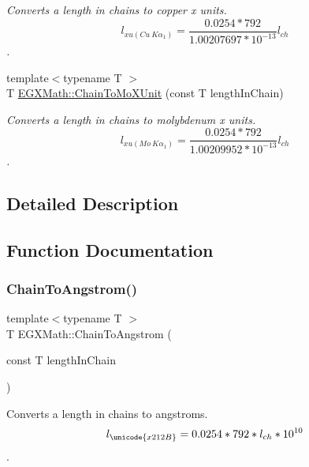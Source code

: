 \begin{DoxyCompactItemize}
\begin{DoxyCompactList}\small\item\em Converts a length in chains to copper x units. \[ l_{xu(Cu\ K\alpha_1)}=\frac{0.0254 * 792}{1.00207697*10^{-13}} l_{ch}\]. \end{DoxyCompactList}\item 
{\footnotesize template$<$typename T $>$ }\\T \mbox{\hyperlink{group___e_g_x_math-_conversions-_length_conversions-_surveyors-_chain-_non-_s_i_gae4a2b99d846db53416e9fc5d6f9e957c}{E\+G\+X\+Math\+::\+Chain\+To\+Mo\+X\+Unit}} (const T length\+In\+Chain)
\begin{DoxyCompactList}\small\item\em Converts a length in chains to molybdenum x units. \[ l_{xu(Mo\ K\alpha_1)}=\frac{0.0254 * 792}{1.00209952*10^{-13}} l_{ch}\]. \end{DoxyCompactList}\end{DoxyCompactItemize}


\subsection{Detailed Description}


\subsection{Function Documentation}
\mbox{\label{group___e_g_x_math-_conversions-_length_conversions-_surveyors-_chain-_non-_s_i_ga89e870762310908510aad80d26dc1942}} 
\subsubsection{\texorpdfstring{Chain\+To\+Angstrom()}{ChainToAngstrom()}}
{\footnotesize\ttfamily template$<$typename T $>$ \\
T E\+G\+X\+Math\+::\+Chain\+To\+Angstrom (\begin{DoxyParamCaption}\item[{const T}]{length\+In\+Chain }\end{DoxyParamCaption})}



Converts a length in chains to angstroms. \[ l_{\unicode{x212B}}=0.0254 * 792 * l_{ch} * 10^{10} \]. 

